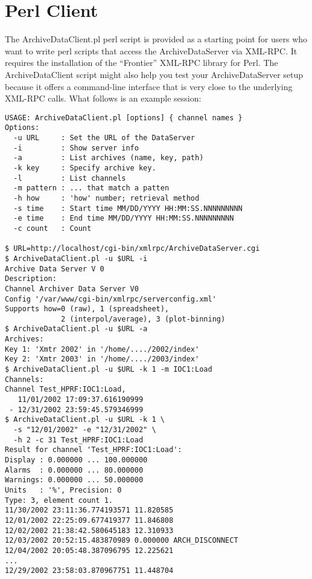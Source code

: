 \section{Perl Client} \label{sec:perlclient}
The ArchiveDataClient.pl perl script is provided as a starting point
for users who want to write perl scripts that access the
ArchiveDataServer via XML-RPC. It requires the installation of the
``Frontier'' XML-RPC library for Perl.  The ArchiveDataClient script
might also help you test your ArchiveDataServer setup because it
offers a command-line interface that is very close to the underlying
XML-RPC calls. What follows is an example session:

\begin{lstlisting}[frame=none,keywordstyle=\sffamily]
USAGE: ArchiveDataClient.pl [options] { channel names } 
Options:
  -u URL     : Set the URL of the DataServer
  -i         : Show server info
  -a         : List archives (name, key, path)
  -k key     : Specify archive key.
  -l         : List channels
  -m pattern : ... that match a patten
  -h how     : 'how' number; retrieval method
  -s time    : Start time MM/DD/YYYY HH:MM:SS.NNNNNNNNN
  -e time    : End time MM/DD/YYYY HH:MM:SS.NNNNNNNNN
  -c count   : Count

$ URL=http://localhost/cgi-bin/xmlrpc/ArchiveDataServer.cgi
$ ArchiveDataClient.pl -u $URL -i
Archive Data Server V 0
Description:
Channel Archiver Data Server V0
Config '/var/www/cgi-bin/xmlrpc/serverconfig.xml'
Supports how=0 (raw), 1 (spreadsheet),
             2 (interpol/average), 3 (plot-binning)
$ ArchiveDataClient.pl -u $URL -a
Archives:
Key 1: 'Xmtr 2002' in '/home/..../2002/index'
Key 2: 'Xmtr 2003' in '/home/..../2003/index'
$ ArchiveDataClient.pl -u $URL -k 1 -m IOC1:Load
Channels:
Channel Test_HPRF:IOC1:Load,
   11/01/2002 17:09:37.616190999
 - 12/31/2002 23:59:45.579346999
$ ArchiveDataClient.pl -u $URL -k 1 \
  -s "12/01/2002" -e "12/31/2002" \
  -h 2 -c 31 Test_HPRF:IOC1:Load
Result for channel 'Test_HPRF:IOC1:Load':
Display : 0.000000 ... 100.000000
Alarms  : 0.000000 ... 80.000000
Warnings: 0.000000 ... 50.000000
Units   : '%', Precision: 0
Type: 3, element count 1.
11/30/2002 23:11:36.774193571 11.820585
12/01/2002 22:25:09.677419377 11.846808
12/02/2002 21:38:42.580645183 12.310933
12/03/2002 20:52:15.483870989 0.000000 ARCH_DISCONNECT
12/04/2002 20:05:48.387096795 12.225621
...
12/29/2002 23:58:03.870967751 11.448704
\end{lstlisting}
